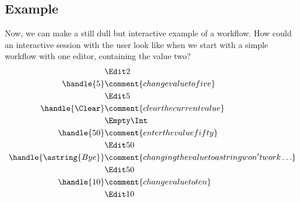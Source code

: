 \subsection{Example}

Now, we can make a still dull but interactive example of a workflow.
How could an interactive session with the user look like when we start with a simple workflow with one editor,
containing the value two?
\begin{align*}
    & \Edit 2 \\
  \handle{5} & \comment{change value to five} \\
    & \Edit 5 \\
  \handle{\Clear} & \comment{clear the current value} \\
    & \Empty \Int \\
  \handle{50} & \comment{enter the value fifty} \\
    & \Edit 50 \\
  \handle{\astring{Bye}} & \comment{changing the value to a string won't work\ldots} \\
    & \Edit 50 \\
  \handle{10} & \comment{change value to ten} \\
    & \Edit 10
\end{align*}
